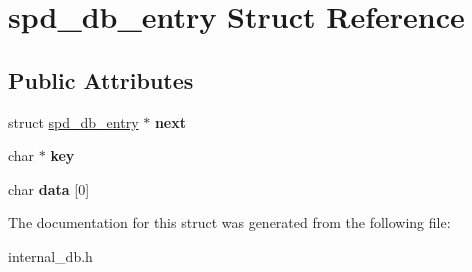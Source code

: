 \hypertarget{structspd__db__entry}{
\section{spd\_\-db\_\-entry Struct Reference}
\label{structspd__db__entry}
}
\subsection*{Public Attributes}
\begin{DoxyCompactItemize}
\item 
\hypertarget{structspd__db__entry_ab04e79bad62bba9d2ea22ece47b63485}{
struct \hyperlink{structspd__db__entry}{spd\_\-db\_\-entry} $\ast$ {\bfseries next}}
\label{structspd__db__entry_ab04e79bad62bba9d2ea22ece47b63485}

\item 
\hypertarget{structspd__db__entry_adc9964ae92ce02221a12fe9e47fdb245}{
char $\ast$ {\bfseries key}}
\label{structspd__db__entry_adc9964ae92ce02221a12fe9e47fdb245}

\item 
\hypertarget{structspd__db__entry_a2149f79fd3fc8bdbf86f98210b831244}{
char {\bfseries data} \mbox{[}0\mbox{]}}
\label{structspd__db__entry_a2149f79fd3fc8bdbf86f98210b831244}

\end{DoxyCompactItemize}


The documentation for this struct was generated from the following file:\begin{DoxyCompactItemize}
\item 
internal\_\-db.h\end{DoxyCompactItemize}

